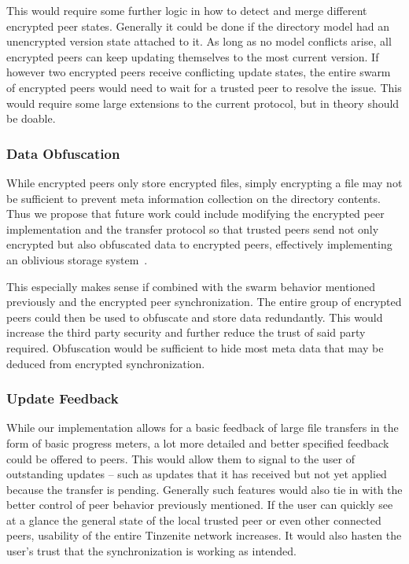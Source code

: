 This would require some further logic in how to detect and merge different encrypted peer states.
Generally it could be done if the directory model had an unencrypted version state attached to it.
As long as no model conflicts arise, all encrypted peers can keep updating themselves to the most current version.
If however two encrypted peers receive conflicting update states, the entire swarm of encrypted peers would need to wait for a trusted peer to resolve the issue.
This would require some large extensions to the current protocol, but in theory should be doable.

\subsubsection{Data Obfuscation}
\label{subs:Data Obfuscation}

While encrypted peers only store encrypted files, simply encrypting a file may not be sufficient to prevent meta information collection on the directory contents.
Thus we propose that future work could include modifying the encrypted peer implementation and the transfer protocol so that trusted peers send not only encrypted but also obfuscated data to encrypted peers, effectively implementing an oblivious storage system~\cite{goldreich1996software}.

This especially makes sense if combined with the swarm behavior mentioned previously and the encrypted peer synchronization.
The entire group of encrypted peers could then be used to obfuscate and store data redundantly.
This would increase the third party security and further reduce the trust of said party required.
Obfuscation would be sufficient to hide most meta data that may be deduced from encrypted synchronization.

\subsubsection{Update Feedback}
\label{subs:Update Feedback}

While our implementation allows for a basic feedback of large file transfers in the form of basic progress meters, a lot more detailed and better specified feedback could be offered to peers.
This would allow them to signal to the user of outstanding updates -- such as updates that it has received but not yet applied because the transfer is pending.
Generally such features would also tie in with the better control of peer behavior previously mentioned.
If the user can quickly see at a glance the general state of the local trusted peer or even other connected peers, usability of the entire Tinzenite network increases.
It would also hasten the user's trust that the synchronization is working as intended.

